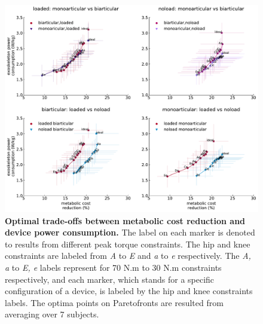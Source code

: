 \documentclass[10pt,letterpaper]{article}
\begin{document}
\begin{figure}[ht]   
	\centering
	\includegraphics[width=\linewidth]{Pareto_Simulations_Figures/PaperFigure_Main_Pareto.pdf}
	\vspace{1mm}
	\caption{{\small\textbf{Optimal trade-offs between metabolic cost reduction and device power consumption.} The label on each marker is denoted to results from different peak torque constraints. The hip and knee constraints are labeled from {\it A} to {\it E} and {\it a} to {\it e} respectively. The {\it A, a} to {\it E, e} labels represent for 70 N.m to 30 N.m constraints respectively, and each marker, which stands for a specific configuration of a device, is labeled by the hip and knee constraints labels. The optima points on Paretofronts are resulted from averaging over 7 subjects.}}
	\label{Fig_Main_Paretofronts}
\end{figure}
\end{document}
